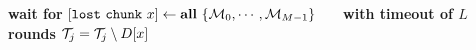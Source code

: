 \documentclass{article}
\begin{document}
\pagestyle{empty}

\newcommand{\send}{\Rightarrow}
\newcommand{\sendto}{\rightarrow}
\newcommand{\recv}{\Leftarrow}
\algrenewcommand{}

\begin{algorithmic}
  
  \State \textbf{wait for} $[\mathtt{lost~chunk}~x] \gets \textbf{all}~\{{\cal M}_0,\cdots, {\cal M}_{M-1}\}$
  \State~~~\textbf{with timeout of $L$ rounds}
  ${\cal T}_j = {\cal T}_j \setminus D[x]$
  \EndIf
  \EndWhile
  \EndProcedure
  
\end{algorithmic}
\end{document}
